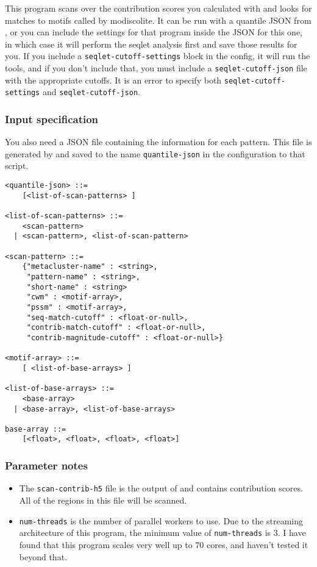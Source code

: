 \documentclass{article}
\begin{document}
This program scans over the contribution scores you calculated with
 and looks for matches to motifs called by modiscolite.
It can be run with a quantile JSON from , or you can
include the settings for that program inside the JSON for this one, in which
case it will perform the seqlet analysis first and save those results for you.
If you include a \texttt{seqlet-cutoff-settings} block in the config, it will
run the  tools, and if you don't include that, you
must include a \texttt{seqlet-cutoff-json} file with the appropriate cutoffs.
It is an error to specify both \texttt{seqlet-cutoff-settings} and
\texttt{seqlet-cutoff-json}.


\subsubsection{Input specification}



You also need a JSON file containing the information for each pattern.
This file is generated by  and saved to the name
\texttt{quantile-json} in the configuration to that script.

\begin{lstlisting}
<quantile-json> ::=
    [<list-of-scan-patterns> ]

<list-of-scan-patterns> ::=
    <scan-pattern>
  | <scan-pattern>, <list-of-scan-pattern>

<scan-pattern> ::=
    {"metacluster-name" : <string>,
     "pattern-name" : <string>,
     "short-name" : <string>
     "cwm" : <motif-array>,
     "pssm" : <motif-array>,
     "seq-match-cutoff" : <float-or-null>,
     "contrib-match-cutoff" : <float-or-null>,
     "contrib-magnitude-cutoff" : <float-or-null>}

<motif-array> ::=
    [ <list-of-base-arrays> ]

<list-of-base-arrays> ::=
    <base-array>
  | <base-array>, <list-of-base-arrays>

base-array ::=
    [<float>, <float>, <float>, <float>]
\end{lstlisting}


\subsubsection{Parameter notes}
\begin{itemize}
    \item The \texttt{scan-contrib-h5} file is the output of
         and contains contribution scores.
        All of the regions in this file will be scanned.
    \item \texttt{num-threads} is the number of parallel workers to use.
        Due to the streaming architecture of this program, the minimum value
        of \texttt{num-threads} is 3.
        I have found that this program scales very well up to 70 cores, and
        haven't tested it beyond that.
\end{itemize}
\end{document}
